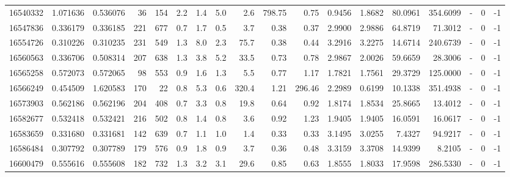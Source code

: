 \begin{tabular}{rrrrrrrrrrrrrrrlrr}
  16540332 & 1.071636 &   0.536076 &   36 &  154 &      2.2 &      1.4 &     5.0 &      2.6 &     798.75 &        0.75 &  0.9456 &  1.8682 &   80.0961 &  354.6099 &             - &        0 &         -1 \\
  16547836 & 0.336179 &   0.336185 &  221 &  677 &      0.7 &      1.7 &     0.5 &      3.7 &       0.38 &        0.37 &  2.9900 &  2.9886 &   64.8719 &   71.3012 &             - &        0 &         -1 \\
  16554726 & 0.310226 &   0.310235 &  231 &  549 &      1.3 &      8.0 &     2.3 &     75.7 &       0.38 &        0.44 &  3.2916 &  3.2275 &   14.6714 &  240.6739 &             - &        0 &         -1 \\
  16560563 & 0.336706 &   0.508314 &  207 &  638 &      1.3 &      3.8 &     5.2 &     33.5 &       0.73 &        0.78 &  2.9867 &  2.0026 &   59.6659 &   28.3006 &             - &        0 &         -1 \\
  16565258 & 0.572073 &   0.572065 &   98 &  553 &      0.9 &      1.6 &     1.3 &      5.5 &       0.77 &        1.17 &  1.7821 &  1.7561 &   29.3729 &  125.0000 &             - &        0 &         -1 \\
  16566249 & 0.454509 &   1.620583 &  170 &   22 &      0.8 &      5.3 &     0.6 &    320.4 &       1.21 &      296.46 &  2.2989 &  0.6199 &   10.1338 &  351.4938 &             - &        0 &         -1 \\
  16573903 & 0.562186 &   0.562196 &  204 &  408 &      0.7 &      3.3 &     0.8 &     19.8 &       0.64 &        0.92 &  1.8174 &  1.8534 &   25.8665 &   13.4012 &             - &        0 &         -1 \\
  16582677 & 0.532418 &   0.532421 &  216 &  502 &      0.8 &      1.4 &     0.8 &      3.6 &       0.92 &        1.23 &  1.9405 &  1.9405 &   16.0591 &   16.0617 &             - &        0 &         -1 \\
  16583659 & 0.331680 &   0.331681 &  142 &  639 &      0.7 &      1.1 &     1.0 &      1.4 &       0.33 &        0.33 &  3.1495 &  3.0255 &    7.4327 &   94.9217 &             - &        0 &         -1 \\
  16586484 & 0.307792 &   0.307789 &  179 &  576 &      0.9 &      1.8 &     0.9 &      3.7 &       0.36 &        0.48 &  3.3159 &  3.3708 &   14.9399 &    8.2105 &             - &        0 &         -1 \\
  16600479 & 0.555616 &   0.555608 &  182 &  732 &      1.3 &      3.2 &     3.1 &     29.6 &       0.85 &        0.63 &  1.8555 &  1.8033 &   17.9598 &  286.5330 &             - &        0 &         -1 \\

\end{tabular}

